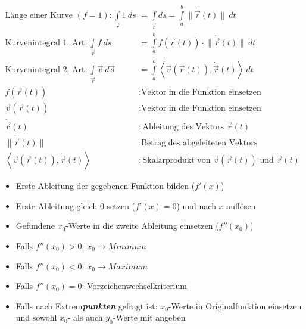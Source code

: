 \documentclass[12pt]{article}
\begin{document}
    \begin{tcolorbox}[
    colback=Orange!5!white,
    colframe=Orange!75!black,
    title={\centering Kurvenintegrale}]
    \begin{align*}
        \text{Länge einer Kurve }(f=1)\text{:} \: \int\limits_{\Vec{r}} 1 \: ds &= \int\limits_{\Vec{r}} ds = \int\limits_a^b \lVert \Dot{\Vec{r}}(t) \rVert \: dt \\
        \text{Kurvenintegral 1. Art:} \: \int\limits_{\Vec{r}} f \: ds &= \int\limits_a^b f(\Vec{r}(t)) \cdot \lVert \Dot{\Vec{r}}(t) \rVert \: dt \\
        \text{Kurvenintegral 2. Art:} \: \int\limits_{\Vec{r}} \Vec{v} \: d\Vec{s} &= \int\limits_a^b \left< \Vec{v}(\Vec{r}(t)) , \Dot{\Vec{r}}(t) \right> \: dt \\
        f(\Vec{r}(t)) &: \text{Vektor in die Funktion einsetzen} \\
        \Vec{v}(\Vec{r}(t)) &: \text{Vektor in die Funktion einsetzen} \\
        \Dot{\Vec{r}}(t) &: \text{Ableitung des Vektors } {\Vec{r}}(t) \\
        \lVert \Dot{\Vec{r}}(t) \rVert &: \text{Betrag des abgeleiteten Vektors} \\
        \left< \Vec{v}(\Vec{r}(t)) , \Dot{\Vec{r}}(t) \right> &: \text{Skalarprodukt von } \Vec{v}(\Vec{r}(t)) \text{ und } \Dot{\Vec{r}}(t)
    \end{align*}
    \end{tcolorbox}

    \begin{tcolorbox}[
    colback=Yellow!5!white,
    colframe=Yellow!75!black,
    title={\centering Lokale Extremstellen}]
    \begin{itemize}
        \item Erste Ableitung der gegebenen Funktion bilden ($f'(x)$)
        \item Erste Ableitung gleich 0 setzen ($f'(x) = 0$) und nach $x$ auflösen
        \item Gefundene $x_0$-Werte in die zweite Ableitung einsetzen ($f''(x_0)$)
        \item Falls $f''(x_0) > 0$: $x_0 \to Minimum$
        \item Falls $f''(x_0) < 0$: $x_0 \to Maximum$
        \item Falls $f''(x_0) = 0$: Vorzeichenwechselkriterium
        \item Falls nach Extrem\textbf{\textit{punkten}} gefragt ist: $x_0$-Werte in Originalfunktion einsetzen und sowohl $x_0$- als auch $y_0$-Werte mit angeben
    \end{itemize}
    \end{tcolorbox}
\end{document}
